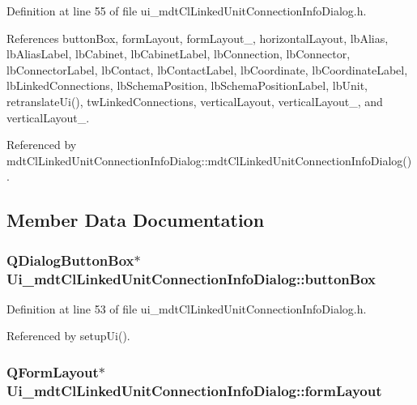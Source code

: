 Definition at line 55 of file ui\-\_\-mdt\-Cl\-Linked\-Unit\-Connection\-Info\-Dialog.\-h.



References button\-Box, form\-Layout, form\-Layout\-\_, horizontal\-Layout, lb\-Alias, lb\-Alias\-Label, lb\-Cabinet, lb\-Cabinet\-Label, lb\-Connection, lb\-Connector, lb\-Connector\-Label, lb\-Contact, lb\-Contact\-Label, lb\-Coordinate, lb\-Coordinate\-Label, lb\-Linked\-Connections, lb\-Schema\-Position, lb\-Schema\-Position\-Label, lb\-Unit, retranslate\-Ui(), tw\-Linked\-Connections, vertical\-Layout, vertical\-Layout\-\_, and vertical\-Layout\-\_.



Referenced by mdt\-Cl\-Linked\-Unit\-Connection\-Info\-Dialog\-::mdt\-Cl\-Linked\-Unit\-Connection\-Info\-Dialog().



\subsection{Member Data Documentation}
\hypertarget{class_ui__mdt_cl_linked_unit_connection_info_dialog_a5cabb5abc0be0397d820767dfc88faa4}{
\subsubsection[{button\-Box}]{\setlength{\rightskip}{0pt plus 5cm}Q\-Dialog\-Button\-Box$\ast$ Ui\-\_\-mdt\-Cl\-Linked\-Unit\-Connection\-Info\-Dialog\-::button\-Box}}\label{class_ui__mdt_cl_linked_unit_connection_info_dialog_a5cabb5abc0be0397d820767dfc88faa4}


Definition at line 53 of file ui\-\_\-mdt\-Cl\-Linked\-Unit\-Connection\-Info\-Dialog.\-h.



Referenced by setup\-Ui().

\hypertarget{class_ui__mdt_cl_linked_unit_connection_info_dialog_a2db825422e95efefba46919874b5cf1e}{
\subsubsection[{form\-Layout}]{\setlength{\rightskip}{0pt plus 5cm}Q\-Form\-Layout$\ast$ Ui\-\_\-mdt\-Cl\-Linked\-Unit\-Connection\-Info\-Dialog\-::form\-Layout}}\label{class_ui__mdt_cl_linked_unit_connection_info_dialog_a2db825422e95efefba46919874b5cf1e}


